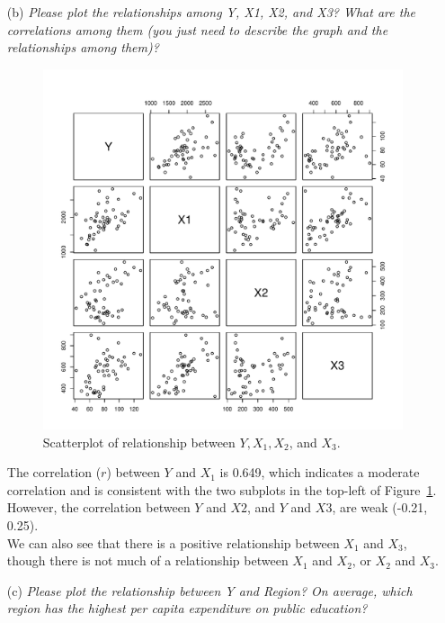 \documentclass[12pt,letterpaper]{article}
\begin{document}
\begin{itemize}
\item [(b)] 
\emph{Please plot the relationships among \emph{Y}, \emph{X1}, \emph{X2}, and \emph{X3}? What are the correlations among them (you just need to describe the graph and the relationships among them)?}

  
\vspace{.25cm}

\begin{figure}[h!]\centering

	\caption{\footnotesize Scatterplot of relationship between $Y, X_1, X_2$, and $X_3$.}
		\label{fig:plot_3b}
	\includegraphics[width=.85\textwidth]{plot_2a.pdf}
\end{figure}

The correlation ($r$) between $Y$ and $X_1$ is 0.649, which indicates a moderate correlation and is consistent with the two subplots in the top-left of Figure~\ref{fig:plot_3b}. However, the correlation between $Y$ and $X2$, and $Y$ and $X3$, are weak (-0.21, 0.25).\\

We can also see that there is a positive relationship between $X_1$ and $X_3$, though there is not much of a relationship between $X_1$ and $X_2$, or $X_2$ and $X_3$. 

\vspace*{1cm}
\item [(c)]
\emph{Please plot the relationship between \emph{Y} and \emph{Region}? On average, which region has the highest per capita expenditure on public education?}


\end{itemize}
\end{document}
